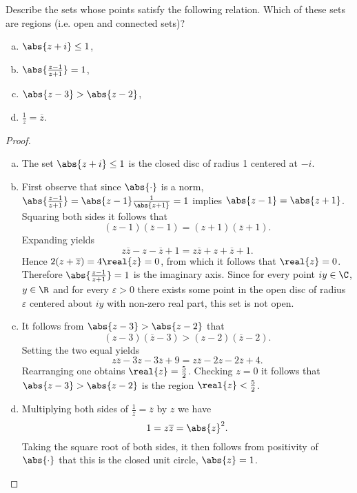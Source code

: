 \documentclass[12pt]{amsart}
\begin{document}
\begin{thm}
  Describe the sets whose points satisfy the following relation.
  Which of these sets are regions (i.e. open and connected sets)?
  \begin{enumerate}[(a)]
  \item
    $\abs{z + i} \leq 1$,
  \item
    $\abs{\frac{z - 1}{z + 1}} = 1$,
  \item
    $\abs{z - 3} > \abs{z - 2}$,
  \item
    $\frac{1}{z} = \overline{z}$.
  \end{enumerate}
  \begin{proof}
    \begin{enumerate}[(a)]
    \item
      The set $\abs{z + i} \leq 1$ is the closed disc of radius 1 centered at $-i$.
    \item
      First observe that since $\abs{\cdot}$ is a norm,  $\abs{\frac{z - 1}{z + 1}} = \abs{z - 1}\frac{1}{\abs{z + 1}} = 1$ implies $\abs{z - 1} = \abs{z + 1}$.
      Squaring both sides it follows that  $$(z - 1)(\overline{z} - 1) = (z + 1)(\overline{z} + 1).$$
      Expanding yields $$z\overline{z} - z - \overline{z} + 1 = z\overline{z} + z + \overline{z} + 1.$$
      Hence $2(z + \overline{z}) = 4\real{z} = 0$, from which it follows that $\real{z} = 0$.
      Therefore $\abs{\frac{z - 1}{z + 1}} = 1$ is the imaginary axis.
      Since for every point $iy \in \C$, $y \in \R$ and for every $\varepsilon > 0$ there exists some point in the open disc of radius $\varepsilon$ centered about $iy$ with non-zero real part, this set is not open. 
    \item
      It follows from $\abs{z - 3} > \abs{z - 2}$ that $$(z - 3)(\overline{z} - 3) > (z - 2)(\overline{z} - 2).$$
      Setting the two equal yields 
      $$z\overline{z} - 3z - 3\overline{z} + 9 = z\overline{z} - 2z - 2\overline{z} + 4.$$
      Rearranging one obtains $\real{z} = \frac{5}{2}$.
      Checking $z = 0$ it follows that $\abs{z - 3} > \abs{z - 2}$ is the region $\real{z} < \frac{5}{2}$.
    \item
      Multiplying both sides of $\frac{1}{z} = \overline{z}$ by $z$ we have 
      $$1 = z\overline{z} = \abs{z}^2.$$
      Taking the square root of both sides, it then follows from positivity of $\abs{\cdot}$ that this is the closed unit circle, $\abs{z} = 1$.
    \end{enumerate}
  \end{proof}
\end{thm}
\end{document}
